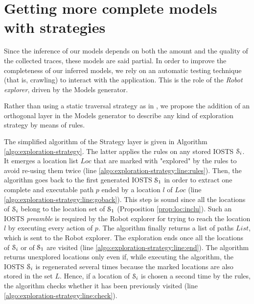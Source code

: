
\section{Getting more complete models with strategies}
\label{sec:modelinf:webapps:strategy}

Since the inference of our models depends on both the amount and
the quality of the collected traces, these models are said
partial. In order to improve the completeness of our inferred
models, we rely on an automatic testing technique (that is,
crawling) to interact with the application. This is the role of
the \emph{Robot explorer}, driven by the Models generator.

Rather than using a static traversal strategy as in
\cite{Memon:2003,concolicandroid12,crawljax:tweb12,
Amalfitano:2012:UGR:2351676.2351717, WPX13}, we propose the
addition of an orthogonal layer in the Models generator to
describe any kind of exploration strategy by means of rules.

The simplified algorithm of the Strategy layer is given in
Algorithm \ref{algo:exploration-strategy}. The latter applies the
rules on any stored IOSTS $\EuScript{S}_i$. It emerges a location
list $Loc$ that are marked with "explored" by the rules to avoid
re-using them twice (line
\ref{algo:exploration-strategy:line:rules}). Then, the algorithm
goes back to the first generated IOSTS $\EuScript{S}_1$ in order
to extract one complete and executable path $p$ ended by a
location $l$ of $Loc$ (line
\ref{algo:exploration-strategy:line:goback}). This step is sound
since all the locations of $\EuScript{S}_i$ belong to the
location set of $\EuScript{S}_1$ (Proposition
\ref{prop:loc:inclu}). Such an IOSTS \emph{preamble} is required
by the Robot explorer for trying to reach the location $l$ by
executing every action of $p$. The algorithm finally returns a
list of paths $List$, which is sent to the Robot explorer. The
exploration ends once all the locations of $\EuScript{S}_i$ or of
$\EuScript{S}_1$ are visited (line
\ref{algo:exploration-strategy:line:end}). The algorithm returns
unexplored locations only even if, while executing the algorithm,
the IOSTS $\EuScript{S}_i$ is regenerated several times because
the marked locations are also stored in the set $L$. Hence, if a
location of $\EuScript{S}_i$ is chosen a second time by the
rules, the algorithm checks whether it has been previously
visited (line \ref{algo:exploration-strategy:line:check}).

